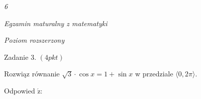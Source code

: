 \documentclass[a4paper,12pt]{article}
\begin{document}
{\it 6}

{\it Egzamin maturalny z matematyki}

{\it Poziom rozszerzony}

Zadanie 3. $(4pkt)$

Rozwiąz równanie $\sqrt{3}\cdot\cos x=1+\sin x$ w przedziale $\langle 0, 2\pi\rangle.$

Odpowied $\acute{\mathrm{z}}$:
\end{document}
